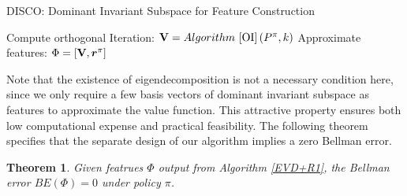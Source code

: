 \documentclass[onecolumn, conference]{IEEEtran}
\newtheorem{theorem}{\textbf{Theorem}}
\begin{document}
\vspace{4pt}
\begin{algorithm}[H]
        \caption{DISCO: Dominant Invariant Subspace for Feature Construction\label{EVD+R1}}
        Compute orthogonal Iteration: ${\bf V} = Algorithm~{\ref{OI}}\left(P^\pi, k\right)$\;
        Approximate features: $\Phi = [{\bf V}, \boldsymbol{r}^\pi ]$\;
\end{algorithm}
\vspace{4pt}
Note that the existence of eigendecomposition is not a necessary condition here, since we only require a few basis vectors of dominant invariant subspace as features to approximate the value function. This attractive property ensures both low computational expense and practical feasibility. The following theorem specifies that the separate design of our algorithm implies a zero Bellman error. 
\pagebreak
\begin{theorem}\label{theorem:tabular}
Given featrues $\Phi$ output from Algorithm \ref{EVD+R1}, the Bellman error $BE(\Phi)=0$ under policy $\pi$. 
\end{theorem}
\end{document}
